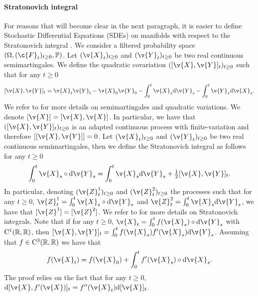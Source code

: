 \paragraph{Stratonovich integral}
For reasons that will become clear in the next paragraph, it is easier to define Stochastic Differential Equations (SDEs) on manifolds with respect to the Stratonovich integral \cite[Part II, Chapter 3]{kloeden:platen:2011}.
We consider a filtered probability space \((\Omega, (\c{F}_t)_{t \geq 0}, \bb{P})\).
Let \((\v{X}_t)_{t \geq 0}\) and \((\v{Y}_t)_{t \geq 0}\) be two real continuous semimartingales.
We define the quadratic covariation \(([\v{X},\v{Y}]_t)_{t \geq 0}\) such that for any \(t \geq 0\) \begin{equation} {[\v{X},\v{Y}]_t = \v{X}_t \v{Y}_t - \v{X}_0\v{Y}_0 - \int_0^t \v{X}_s \mathrm{d} \v{Y}_s - \int_0^t \v{Y}_s \mathrm{d} \v{X}_s .
	}
\end{equation}
We refer to \textcite[Chapter IV]{revuz1999continuous} for more details on semimartingales and quadratic variations.
We denote \([\v{X}] = [\v{X}, \v{X}]\).
In particular, we have that \(([\v{X}, \v{Y}]_t)_{t \geq 0}\) is an adapted continuous process with finite-variation and therefore \([[\v{X}, \v{Y}]] = 0\).
Let \((\v{X}_t)_{t \geq 0}\) and \((\v{Y}_t)_{t \geq 0}\) be two real continuous semimartingales, then we define the Stratonovich integral as follows for any \(t \geq 0\) \begin{equation} { \int_0^t \v{X}_s \circ \mathrm{d} \v{Y}_s = \int_0^t \v{X}_s \mathrm{d} \v{Y}_s + \tfrac{1}{2} [\v{X}, \v{Y}]_t .
	}
\end{equation}
In particular, denoting \((\v{Z}_t^1)_{t \geq 0}\) and \((\v{Z}_t^2)_{t \geq 0}\) the processes such that for any \(t \geq 0\), \(\v{Z}_t^1 = \int_0^t \v{X}_s \circ \mathrm{d} \v{Y}_s\) and \(\v{Z}_t^2 = \int_0^t \v{X}_s \mathrm{d} \v{Y}_s\), we have that \([\v{Z}^1] = [\v{Z}^2]\).
We refer to \textcite{kurtz1995stratonovich} for more details on Stratonovich integrals.
Note that if for any \(t \geq 0\), \(\v{X}_t = \int_0^t f(\v{X}_s) \circ \mathrm{d} \v{Y}_s\) with \(\mathrm{C}^1(\mathbb{R}, \mathbb{R})\), then \([\v{X}, \v{Y}]_t = \int_0^t f(\v{X}_s) f'(\v{X}_s) \mathrm{d} \v{Y}_s\).
Assuming that \(f \in \mathrm{C}^3(\mathbb{R}, \mathbb{R})\) we have that \cite[Chapter IV, Exercise 3.15]{revuz1999continuous} \begin{equation} \label{eq:stratanovitch_lemma} { f(\v{X}_t) = f(\v{X}_0) + \int_0^t f'(\v{X}_s) \circ \mathrm{d} \v{X}_s .
	}
\end{equation}
The proof relies on the fact that for any \(t \geq 0\), \(\mathrm{d} [\v{X}, f'(\v{X})]_t = f''(\v{X}_t) \mathrm{d} [\v{X}]_t\).
